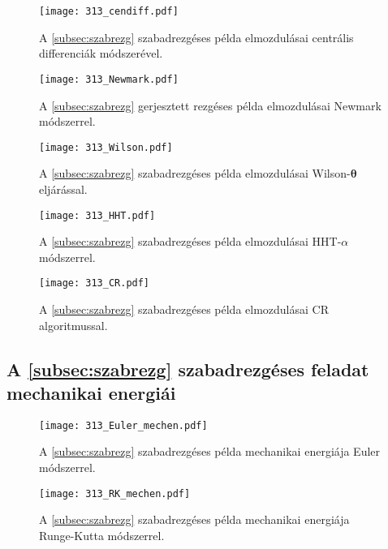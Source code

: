\begin{figure}[H]
\centering
\texttt{[image: 313\_cendiff.pdf]}
\caption{A \ref{subsec:szabrezg} szabadrezgéses példa elmozdulásai centrális differenciák módszerével.}
\label{fig:szabrezg_er_centdiff}
\end{figure}

\begin{figure}[H]
\centering
\texttt{[image: 313\_Newmark.pdf]}
\caption{A \ref{subsec:szabrezg} gerjesztett rezgéses példa elmozdulásai Newmark módszerrel.}
\label{fig:szabrezg_er_newmark}
\end{figure}

\begin{figure}[H]
\centering
\texttt{[image: 313\_Wilson.pdf]}
\caption{A \ref{subsec:szabrezg} szabadrezgéses példa elmozdulásai Wilson-$\boldsymbol\theta$ eljárással.}
\label{fig:szabrezg_er_wilson}
\end{figure}

\begin{figure}[H]
\centering
\texttt{[image: 313\_HHT.pdf]}
\caption{A \ref{subsec:szabrezg} szabadrezgéses példa elmozdulásai HHT-$\alpha$ módszerrel.}
\label{fig:szabrezg_er_hht}
\end{figure}

\begin{figure}[H]
\centering
\texttt{[image: 313\_CR.pdf]}
\caption{A \ref{subsec:szabrezg} szabadrezgéses példa elmozdulásai CR algoritmussal.}
\label{fig:szabrezg_er_cr}
\end{figure}

\subsection{A \ref{subsec:szabrezg} szabadrezgéses feladat mechanikai energiái}\label{sec:függ_szabrezg_mechen}

\begin{figure}[H]
\centering
\texttt{[image: 313\_Euler\_mechen.pdf]}
\caption{A \ref{subsec:szabrezg} szabadrezgéses példa mechanikai energiája Euler módszerrel.}
\end{figure}

\begin{figure}[H]
\centering
\texttt{[image: 313\_RK\_mechen.pdf]}
\caption{A \ref{subsec:szabrezg} szabadrezgéses példa mechanikai energiája Runge-Kutta módszerrel.}
\end{figure}

